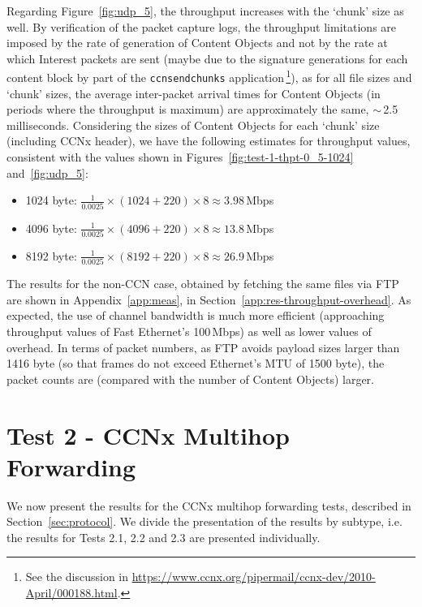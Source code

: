 Regarding Figure~\ref{fig:udp_5}, the throughput increases with the 
`chunk' size as well. By verification of the packet capture logs, the throughput 
limitations are imposed by the rate of generation of 
Content Objects and not by the rate at which Interest packets are sent 
(maybe due to the signature generations for each content block 
by part of the \verb+ccnsendchunks+ application\,\footnote{See the discussion 
in \url{https://www.ccnx.org/pipermail/ccnx-dev/2010-April/000188.html}.}), as 
for all file sizes and `chunk' sizes, the average inter-packet arrival times 
for Content Objects (in periods where the throughput is maximum) are 
approximately the same, $\sim$\,2.5 milliseconds. Considering the sizes of 
Content Objects for each 
`chunk' size (including CCNx header), we have the following estimates for 
throughput values, consistent with the values shown in 
Figures~\ref{fig:test-1-thpt-0_5-1024} and~\ref{fig:udp_5}:

\begin{itemize}

    \item 1024 byte: $\frac{1}{0.0025} \times (1024 + 220) \times 8 \approx 3.98$\,Mbps
    \item 4096 byte: $\frac{1}{0.0025} \times (4096 + 220) \times 8 \approx 13.8$\,Mbps
    \item 8192 byte: $\frac{1}{0.0025} \times (8192 + 220) \times 8 \approx 26.9$\,Mbps

\end{itemize}

The results for the non-CCN case, obtained by fetching the same files via FTP 
are shown in Appendix~\ref{app:meas}, in Section~\ref{app:res-throughput-overhead}. As expected, 
the use of channel bandwidth is much more efficient 
(approaching throughput values of Fast Ethernet's 100\,Mbps) as well as lower values of 
overhead. In terms of packet numbers, as FTP avoids payload sizes larger than 
1416 byte (so that frames do not exceed Ethernet’s MTU of 1500 byte), the packet counts 
are (compared with the number of Content Objects) larger.

\section{Test 2 - CCNx Multihop Forwarding}
\label{sec:res-multihop-for}

We now present the results for the CCNx multihop forwarding tests, described 
in Section~\ref{sec:protocol}. We divide the presentation of the results by 
subtype, i.e. the results for Tests 2.1, 2.2 and 2.3 are presented individually.

